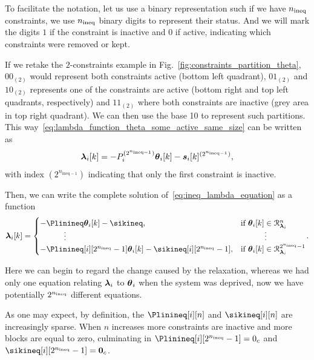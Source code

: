 \documentclass[../main.tex]{subfiles}
\begin{document}
To facilitate the notation, let us use a binary representation such if we have $n_{\text{ineq}}$ constraints, we use $n_{\text{ineq}}$ binary digits to represent their status.
And we will mark the digits $1$ if the constraint is inactive and $0$ if active, indicating which constraints were removed or kept.

If we retake the $2$-constraints example in Fig.~\ref{fig:constraints_partition_theta}, ${00}_{(2)}$ would represent both constraints active (bottom left quadrant), ${01}_{(2)}$ and ${10}_{(2)}$ represents one of the constraints are active (bottom right and top left quadrants, respectively) and ${11}_{(2)}$ where both constraints are inactive (grey area in top right quadrant).
We can then use the base 10 to represent such partitions.
This way~\eqref{eq:lambda_function_theta_some_active_same_size} can be written as
\begin{equation}
  \label{eq:lambda_function_theta_same_size_coded}
  \lambdaik=-\Plin^{(2^{n_{\text{ineq}-1}})}\thetaik-\sik^{(2^{n_{\text{ineq}-1}})},
\end{equation}
with index $(2^{n_{\text{ineq}-1}})$ indicating that only the first constraint is inactive.

Then, we can write the complete solution of~\eqref{eq:ineq_lambda_equation} as
a \pwa{} function
\begin{equation}
  \label{eq:lambdafuntheta}
  \begin{aligned}
    \lambdaik=
    \begin{cases}
      -\Plinineq\thetaik-\sikineq,&\text{if}\ \thetaik \in\set{R}_{\lambdai}^{n}\\
      \qquad\quad \vdots&\qquad\quad \vdots\\
      -\Plinineq[i][2^{\nineq}-1]\thetaik-\sikineq[i][2^{\nineq}-1],&\text{if}\ \thetaik \in\set{R}_{\lambdai}^{2^{\nineq}-1}\\
    \end{cases}
  \end{aligned}.
\end{equation}

Here we can begin to regard the change caused by the relaxation, whereas we had only one equation relating $\boldsymbol{\lambda}_{i}$ to $\boldsymbol{\theta}_{i}$ when the system was deprived, now we have potentially $2^{n_{\text{ineq}}}$ different equations.

\begin{remark}\label{rem:sparse_solutions}
  As one may expect, by definition, the $\Plinineq[i][n]$ and $\sikineq[i][n]$ are increasingly sparse.
  When $n$ increases more constraints are inactive and more blocks are equal to zero, culminating in $\Plinineq[i][2^{\nineq}-1]=0_{c}$ and $\sikineq[i][2^{\nineq}-1]=\0_{c}$.
\end{remark}
\newpage
\end{document}
